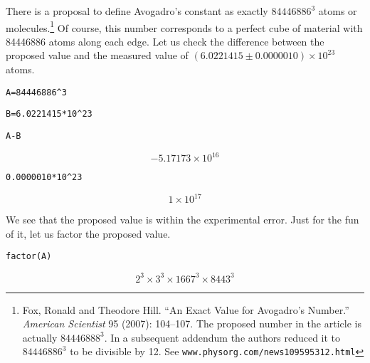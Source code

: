\noindent
There is a proposal to define Avogadro's constant as exactly $84446886^3$
atoms or molecules.\footnote{Fox, Ronald and Theodore Hill.
``An Exact Value for Avogadro's Number.''
{\it American Scientist} 95 (2007): 104--107.
The proposed number in the article is actually $84446888^3$.
In a subsequent addendum the authors reduced it to $84446886^3$ to be divisible
by 12. See {\tt www.physorg.com/news109595312.html}}
Of course, this number corresponds to a perfect cube of material with 84446886
atoms along each edge.
Let us check the difference between the proposed value and the measured value
of $(6.0221415\pm0.0000010)\times10^{23}$ atoms.

\medskip
\verb$A=84446886^3$

\verb$B=6.0221415*10^23$

\verb$A-B$

$$-5.17173\times10^{16}$$

\verb$0.0000010*10^23$

$$1\times10^{17}$$

\medskip
\noindent
We see that the proposed value is within the experimental error.
Just for the fun of it, let us factor the proposed value.

\medskip
\verb$factor(A)$

$$2^3\times3^3\times1667^3\times8443^3$$

